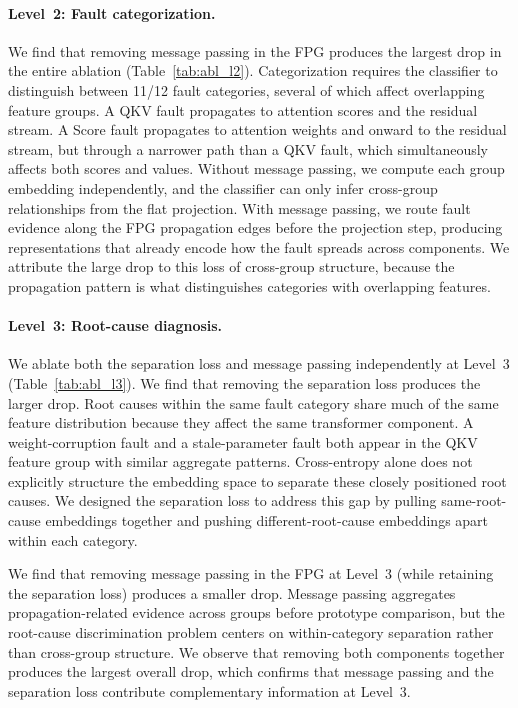 \paragraph{Level~2: Fault categorization.} We find that removing message passing in the FPG produces the largest drop in the entire ablation (Table~\ref{tab:abl_l2}). Categorization requires the classifier to distinguish between 11/12 fault categories, several of which affect overlapping feature groups. A QKV fault propagates to attention scores and the residual stream. A Score fault propagates to attention weights and onward to the residual stream, but through a narrower path than a QKV fault, which simultaneously affects both scores and values. Without message passing, we compute each group embedding independently, and the classifier can only infer cross-group relationships from the flat projection. With message passing, we route fault evidence along the FPG propagation edges before the projection step, producing representations that already encode how the fault spreads across components. We attribute the large drop to this loss of cross-group structure, because the propagation pattern is what distinguishes categories with overlapping features.

\paragraph{Level~3: Root-cause diagnosis.} We ablate both the separation loss and message passing independently at Level~3 (Table~\ref{tab:abl_l3}). We find that removing the separation loss produces the larger drop. Root causes within the same fault category share much of the same feature distribution because they affect the same transformer component. A weight-corruption fault and a stale-parameter fault both appear in the QKV feature group with similar aggregate patterns. Cross-entropy alone does not explicitly structure the embedding space to separate these closely positioned root causes. We designed the separation loss to address this gap by pulling same-root-cause embeddings together and pushing different-root-cause embeddings apart within each category.

We find that removing message passing in the FPG at Level~3 (while retaining the separation loss) produces a smaller drop. Message passing aggregates propagation-related evidence across groups before prototype comparison, but the root-cause discrimination problem centers on within-category separation rather than cross-group structure. We observe that removing both components together produces the largest overall drop, which confirms that message passing and the separation loss contribute complementary information at Level~3.

